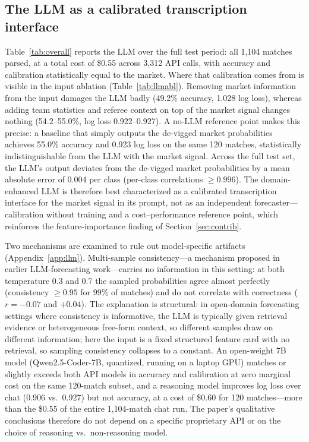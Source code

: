 \documentclass[10pt]{article}
\begin{document}
\subsection{The LLM as a calibrated transcription interface}
\label{sec:llm}
Table~\ref{tab:overall} reports the LLM over the full test period: all 1{,}104
matches parsed, at a total cost of \$0.55 across 3{,}312 API calls, with accuracy
and calibration statistically equal to the market. Where that calibration comes
from is visible in the input ablation (Table~\ref{tab:llmabl}). Removing market
information from the input damages the LLM badly (49.2\% accuracy, 1.028 log
loss), whereas adding team statistics and referee context on top of the market
signal changes nothing (54.2--55.0\%, log loss 0.922--0.927). A no-LLM reference point makes this precise: a baseline
that simply outputs the de-vigged market probabilities achieves 55.0\% accuracy
and 0.923 log loss on the same 120 matches, statistically indistinguishable
from the LLM with the market signal. Across the full test set, the LLM's output
deviates from the de-vigged market probabilities by a mean absolute error of
0.004 per class (per-class correlations $\ge 0.996$). The domain-enhanced LLM
is therefore best characterized as a calibrated transcription interface for the
market signal in its prompt, not as an independent forecaster---calibration
without training and a cost--performance reference point, which reinforces the
feature-importance finding of Section~\ref{sec:contrib}.

Two mechanisms are examined to rule out model-specific artifacts
(Appendix~\ref{app:llm}). Multi-sample consistency---a mechanism
proposed in earlier LLM-forecasting work---carries no information in this
setting: at both temperature 0.3 and 0.7 the sampled probabilities agree almost
perfectly (consistency $\ge 0.95$ for 99\% of matches) and do not correlate
with correctness ($r = -0.07$ and $+0.04$). The explanation is structural: in
open-domain forecasting settings where consistency is informative, the LLM is
typically given retrieval evidence or heterogeneous free-form context, so
different samples draw on different information; here the input is a fixed
structured feature card with no retrieval, so sampling consistency collapses to a
constant. An open-weight 7B model
(Qwen2.5-Coder-7B, quantized, running on a laptop GPU) matches or slightly
exceeds both API models in accuracy and calibration at zero marginal cost on
the same 120-match subset, and a reasoning model improves log loss over chat
(0.906 vs.\ 0.927) but not accuracy, at a cost of \$0.60 for 120 matches---more
than the \$0.55 of the entire 1{,}104-match chat run. The paper's qualitative
conclusions therefore do not depend on a specific proprietary API or on the
choice of reasoning vs.\ non-reasoning model.
\end{document}
